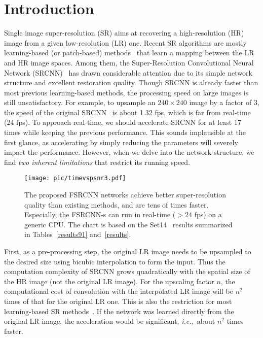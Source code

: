 \documentclass[runningheads]{llncs}
\newcommand{\ie}{\emph{i.e.,}}
\begin{document}
\section{Introduction}
Single image super-resolution (SR) aims at recovering a
high-resolution (HR) image from a given low-resolution (LR)
one. Recent SR algorithms are mostly
learning-based (or patch-based) methods~\cite{Dong2014,Dong2015,yang2013fast,Timofte2013,Timofte2014,Cui2014,Schulter2015,Wang2015}
that learn a mapping between the LR and HR image spaces.
Among them, the Super-Resolution Convolutional Neural Network (SRCNN)~\cite{Dong2014,Dong2015}  has drawn considerable attention due to its simple network structure and excellent restoration quality. Though SRCNN is already faster than most previous learning-based methods, the processing speed on large images
is still unsatisfactory. For example, to upsample an $240\times 240$ image by a factor of 3, the speed of the original SRCNN~\cite{Dong2014} is about 1.32 fps, which is far from real-time (24 fps).
To approach real-time, we should accelerate SRCNN for at least 17 times while keeping the previous performance.
This sounds implausible at the first glance, as accelerating by simply reducing the parameters will severely impact the performance.
However, when we delve into the network structure, we find \textit{two inherent limitations} that restrict its running speed.

\begin{figure}[t]
\centering
  \texttt{[image: pic/timevspsnr3.pdf]}
\caption{The proposed FSRCNN networks achieve better super-resolution quality than existing methods, and are tens of times faster. Especially, the FSRCNN-s can run in real-time ($>24$ fps) on a generic CPU. The chart is based on the Set14~\cite{Zeyde2012} results summarized in Tables~\ref{results91} and~\ref{results}. }
  \label{fig:runtime}
\end{figure}

First, as a pre-processing step, the original LR image needs to
be upsampled to the desired size using bicubic interpolation to form the input. Thus the computation complexity of SRCNN grows quadratically with the spatial size of the HR image (not the original LR image). For the upscaling factor $n$, the computational cost of convolution with the interpolated LR image will be $n^2$ times of that for the original LR one. This is also the restriction for most learning-based SR methods~\cite{Yang2010a,yang2013fast,Timofte2013,Timofte2014,Schulter2015,Wang2015}. If the network was learned directly from the original LR image, the acceleration would be significant, \ie~about $n^2$ times faster.
\end{document}
